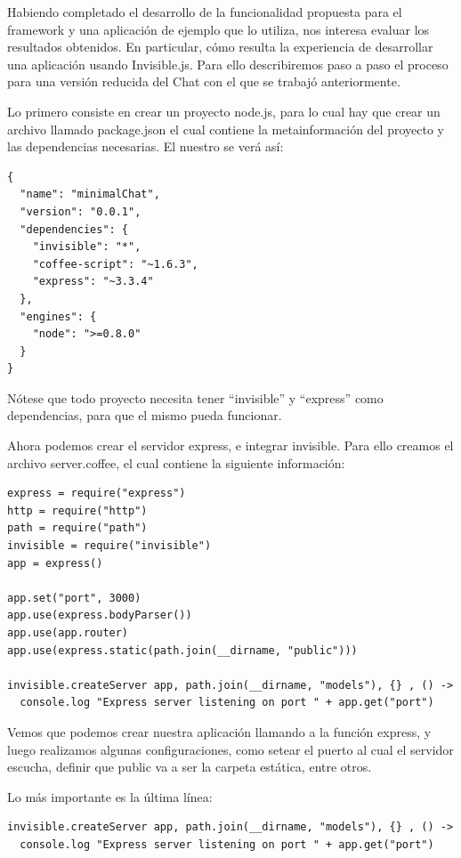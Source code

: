 \documentclass[doc,helv,longtable]{article}
\begin{document}
Habiendo completado el desarrollo de la funcionalidad propuesta para el framework y una aplicación de ejemplo que lo utiliza, nos interesa evaluar los resultados obtenidos. En particular, cómo resulta la experiencia de desarrollar una aplicación usando Invisible.js. Para ello describiremos paso a paso el proceso para una versión reducida del Chat con el que se trabajó anteriormente.

Lo primero consiste en crear un proyecto node.js, para lo cual hay que crear un archivo llamado package.json el cual contiene la metainformación del proyecto y las dependencias necesarias. El nuestro se verá así:

\begin{verbatim}
{
  "name": "minimalChat",
  "version": "0.0.1",
  "dependencies": {
    "invisible": "*",
    "coffee-script": "~1.6.3",
    "express": "~3.3.4"
  },
  "engines": {
    "node": ">=0.8.0"
  }
}
\end{verbatim}

Nótese que todo proyecto necesita tener “invisible” y “express” como dependencias, para que el mismo pueda funcionar.

Ahora podemos crear el servidor express, e integrar invisible. Para ello creamos el archivo server.coffee, el cual contiene la siguiente información:

\begin{verbatim}
express = require("express")
http = require("http")
path = require("path")
invisible = require("invisible")
app = express()

app.set("port", 3000)
app.use(express.bodyParser())
app.use(app.router)
app.use(express.static(path.join(__dirname, "public")))

invisible.createServer app, path.join(__dirname, "models"), {} , () ->
  console.log "Express server listening on port " + app.get("port")
\end{verbatim}

Vemos que podemos crear nuestra aplicación llamando a la función express, y luego realizamos algunas configuraciones, como setear el puerto al cual el servidor escucha, definir que public va a ser la carpeta estática, entre otros.

Lo más importante es la última línea: 

\begin{verbatim}
invisible.createServer app, path.join(__dirname, "models"), {} , () ->
  console.log "Express server listening on port " + app.get("port")
\end{verbatim}
\end{document}
